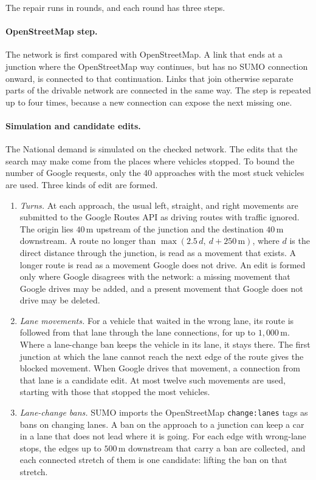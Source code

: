 The repair runs in rounds, and each round has three steps.

\paragraph{OpenStreetMap step.} The network is first compared with
OpenStreetMap. A link that ends at a junction where the OpenStreetMap
way continues, but has no SUMO connection onward, is connected to that
continuation. Links that join otherwise separate parts of the drivable
network are connected in the same way. The step is repeated up to four
times, because a new connection can expose the next missing one.

\paragraph{Simulation and candidate edits.} The National demand is
simulated on the checked network. The edits that the search may make
come from the places where vehicles stopped. To bound the number of
Google requests, only the 40 approaches with the most stuck vehicles
are used. Three kinds of edit are formed.

\begin{enumerate}[label=\textbf{G\arabic*:}]
    \item \emph{Turns.} At each approach, the usual left, straight, and
    right movements are submitted to the Google Routes API as driving
    routes with traffic ignored. The origin lies \(40\,\mathrm{m}\)
    upstream of the junction and the destination \(40\,\mathrm{m}\)
    downstream. A route no longer than \(\max(2.5\,d,\ d+250\,\mathrm{m})\),
    where \(d\) is the direct distance through the junction, is read as
    a movement that exists. A longer route is read as a movement Google
    does not drive. An edit is formed only where Google disagrees with
    the network: a missing movement that Google drives may be added,
    and a present movement that Google does not drive may be deleted.

    \item \emph{Lane movements.} For a vehicle that waited in the wrong
    lane, its route is followed from that lane through the lane
    connections, for up to \(1{,}000\,\mathrm{m}\). Where a lane-change
    ban keeps the vehicle in its lane, it stays there. The first
    junction at which the lane cannot reach the next edge of the route
    gives the blocked movement. When Google drives that movement, a
    connection from that lane is a candidate edit. At most twelve such
    movements are used, starting with those that stopped the most
    vehicles.

    \item \emph{Lane-change bans.} SUMO imports the OpenStreetMap
    \texttt{change:lanes} tags as bans on changing lanes. A ban on the
    approach to a junction can keep a car in a lane that does not lead
    where it is going. For each edge with wrong-lane stops, the edges up
    to \(500\,\mathrm{m}\) downstream that carry a ban are collected,
    and each connected stretch of them is one candidate: lifting the
    ban on that stretch.
\end{enumerate}

